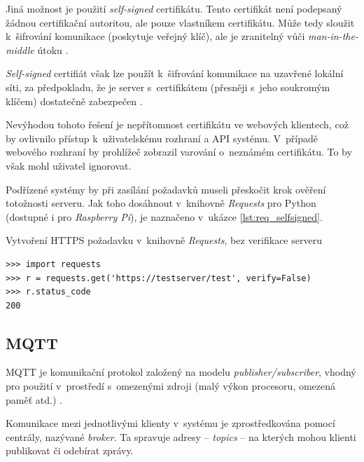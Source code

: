 Jiná možnost je použití \textit{self-signed} certifikátu. Tento certifikát není podepsaný žádnou certifikační autoritou, ale pouze vlastníkem certifikátu. Může tedy sloužit k~šifrování komunikace (poskytuje veřejný klíč), ale je zranitelný vůči \textit{man-in-the-middle} útoku \cite{cert_wallen}.

\textit{Self-signed} certifiát však lze použít k~šifrování komunikace na uzavřené lokální síti, za předpokladu, že je server s~certifikátem (přesněji s~jeho soukromým klíčem) dostatečně zabezpečen \cite{cert_wallen}. 

Nevýhodou tohoto řešení je nepřítomnost certifikátu ve webových klientech, což by ovlivnilo přístup k~uživatelskému rozhraní a API systému. V~případě webového rozhraní by prohlížeč zobrazil varování o~neznámém certifikátu. To by však mohl uživatel ignorovat. 

Podřízené systémy by při zasílání požadavků museli přeskočit krok ověření totožnosti serveru. Jak toho dosáhnout v~knihovně \textit{Requests} pro Python (dostupné i pro \textit{Raspberry Pi}), je naznačeno v~ukázce \ref{lst:req_selfsigned}.

\begin{listing}[htbp]
\caption{\label{lst:req_selfsigned} Vytvoření HTTPS požadavku v~knihovně \textit{Requests}, bez verifikace serveru}
\begin{verbatim}
>>> import requests
>>> r = requests.get('https://testserver/test', verify=False)
>>> r.status_code
200
\end{verbatim}
\end{listing}

\subsection{MQTT}

MQTT je komunikační protokol založený na modelu \textit{publisher/subscriber}, vhod\-ný pro použití v~prostředí s~omezenými zdroji (malý výkon procesoru, omezená paměť atd.) \cite{mqtt_valerie}.

Komunikace mezi jednotlivými klienty v~systému je zprostředkována pomocí centrály, nazývané \textit{broker}. Ta spravuje adresy -- \textit{topics} -- na kterých mohou klienti publikovat či odebírat zprávy.

